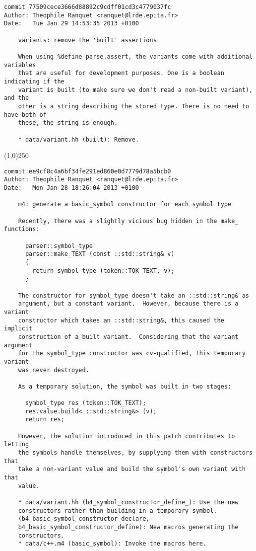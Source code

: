 \begin{verbatim}
commit 77509cece3666d88892c9cdff01cd3c4779037fc
Author: Theophile Ranquet <ranquet@lrde.epita.fr>
Date:   Tue Jan 29 14:53:35 2013 +0100

    variants: remove the 'built' assertions
    
    When using %define parse.assert, the variants come with additional variables
    that are useful for development purposes. One is a boolean indicating if the
    variant is built (to make sure we don't read a non-built variant), and the
    other is a string describing the stored type. There is no need to have both of
    these, the string is enough.
    
    * data/variant.hh (built): Remove.

\end{verbatim}
\line(1,0){250}
\begin{verbatim}
commit ee9cf8c4a6bf34fe291ed860e0d7779d78a5bcb0
Author: Theophile Ranquet <ranquet@lrde.epita.fr>
Date:   Mon Jan 28 18:26:04 2013 +0100

    m4: generate a basic_symbol constructor for each symbol type
    
    Recently, there was a slightly vicious bug hidden in the make_ functions:
    
      parser::symbol_type
      parser::make_TEXT (const ::std::string& v)
      {
        return symbol_type (token::TOK_TEXT, v);
      }
    
    The constructor for symbol_type doesn't take an ::std::string& as
    argument, but a constant variant.  However, because there is a variant
    constructor which takes an ::std::string&, this caused the implicit
    construction of a built variant.  Considering that the variant argument
    for the symbol_type constructor was cv-qualified, this temporary variant
    was never destroyed.
    
    As a temporary solution, the symbol was built in two stages:
    
      symbol_type res (token::TOK_TEXT);
      res.value.build< ::std::string&> (v);
      return res;
    
    However, the solution introduced in this patch contributes to letting
    the symbols handle themselves, by supplying them with constructors that
    take a non-variant value and build the symbol's own variant with that
    value.
    
    * data/variant.hh (b4_symbol_constructor_define_): Use the new
    constructors rather than building in a temporary symbol.
    (b4_basic_symbol_constructor_declare,
    b4_basic_symbol_constructor_define): New macros generating the
    constructors.
    * data/c++.m4 (basic_symbol): Invoke the macros here.

\end{verbatim}

